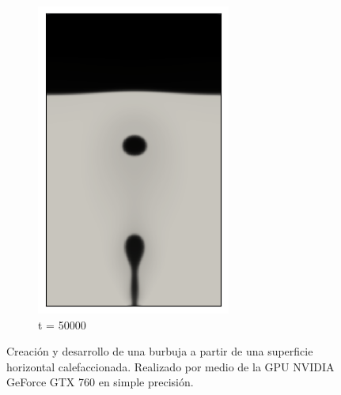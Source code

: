 \begin{figure}[H]
\begin{subfigure}{0.25\textwidth}
		\includegraphics[width=\linewidth]{figs/cap4/cuda_bb_760_s50}
		\caption{t = 50000}
		\label{fig:9}
	\end{subfigure}
	\caption{Creación y desarrollo de una burbuja a partir de una superficie horizontal calefaccionada. Realizado por medio de la GPU NVIDIA GeForce GTX 760 en simple precisión. }
	\label{fig:burbujas_760_simple_cuda}
\end{figure}

\newpage

\fi

\newpage

